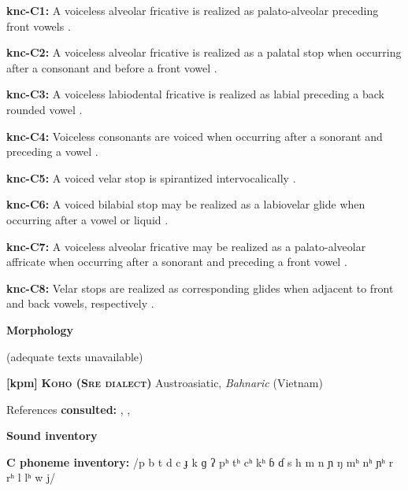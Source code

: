 \textbf{knc-C1:} A voiceless alveolar fricative is realized as palato-alveolar preceding front vowels \citep[20]{Cyffer1998}.



\textbf{knc-C2:} A voiceless alveolar fricative is realized as a palatal stop when occurring after a consonant and before a front vowel \citep[21]{Cyffer1998}.



\textbf{knc-C3:} A voiceless labiodental fricative is realized as labial preceding a back rounded vowel \citep[23]{Cyffer1998}.



\textbf{knc-C4:} Voiceless consonants are voiced when occurring after a sonorant and preceding a vowel \citep[22]{Cyffer1998}.



\textbf{knc-C5:} A voiced velar stop is spirantized intervocalically \citep[22]{Cyffer1998}.



\textbf{knc-C6:} A voiced bilabial stop may be realized as a labiovelar glide when occurring after a vowel or liquid \citep[22]{Cyffer1998}.



\textbf{knc-C7:} A voiceless alveolar fricative may be realized as a palato-alveolar affricate when occurring after a sonorant and preceding a front vowel \citep[21]{Cyffer1998}.



\textbf{knc-C8:} Velar stops are realized as corresponding glides when adjacent to front and back vowels, respectively \citep[22]{Cyffer1998}.



\textbf{Morphology}



(adequate texts unavailable)



\textbf{[kpm]}   \textbf{\textsc{Koho (Sre dialect)}}  Austroasiatic, \textit{Bahnaric} (Vietnam)



References \textbf{consulted:} \citet{LadefogedMaddieson1997}, \citet{Manley1972}, \citet{Olsen2014}



\textbf{Sound inventory}



\textbf{C phoneme inventory:} /p b t d c ɟ k ɡ ʔ pʰ tʰ cʰ kʰ ɓ ɗ s h m n ɲ ŋ mʰ nʰ ɲʰ r rʰ l lʰ w j/



